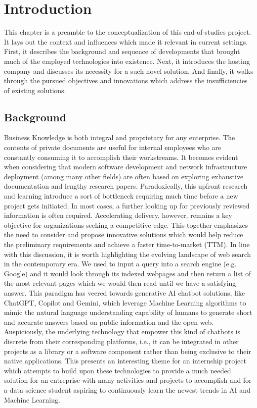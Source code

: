 \chapter{Introduction}
This chapter is a preamble to the conceptualization of this end-of-studies project. It lays out the context and influences which made it relevant in current settings.\newline
First, it describes the background and sequence of developments that brought much of the employed technologies into existence. Next, it introduces the hosting company and discusses its necessity for a such novel solution. And finally, it walks through the pursued objectives and innovations which address the insufficiencies of existing solutions.
\newpage

\section{Background}
Business Knowledge is both integral and proprietary for any enterprise. The contents of private documents are useful for internal employees who are constantly consuming it to accomplish their workstreams. It becomes evident when considering that modern software development and network infrastructure deployment (among many other fields) are often based on exploring exhaustive documentation and lengthy research papers. Paradoxically, this upfront research and learning introduce a sort of bottleneck requiring much time before a new project gets initiated. In most cases, a further looking up for previously reviewed information is often required. Accelerating delivery, however, remains a key objective for organizations seeking a competitive edge. This together emphasizes the need to consider and propose innovative solutions which would help reduce the preliminary requirements and achieve a faster time-to-market (TTM).\bigskip\newline
In line with this discussion, it is worth highlighting the evolving landscape of web search in the contemporary era. We used to input a query into a search engine (e.g. Google) and it would look through its indexed webpages and then return a list of the most relevant pages which we would then read until we have a satisfying answer. This paradigm has veered towards generative AI chatbot solutions, like ChatGPT, Copilot and Gemini, which leverage Machine Learning algorithms to mimic the natural language understanding capability of humans to generate short and accurate answers based on public information and the open web.\smallskip\newline
Auspiciously, the underlying technology that empower this kind of chatbots is discrete from their corresponding platforms, i.e., it can be integrated in other projects as a library or a software component rather than being exclusive to their native applications. This presents an interesting theme for an internship project which attempts to build upon these technologies to provide a much needed solution for an entreprise with many activities and projects to accomplish and for a data science student aspiring to continuously learn the newest trends in AI and Machine Learning.
\newpage

